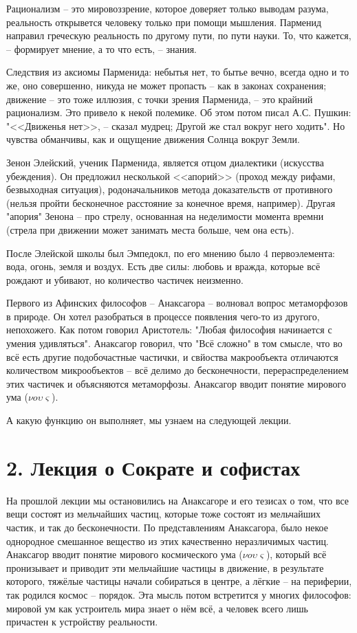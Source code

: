 \documentclass[a4paper, 12pt]{book} %
\begin{document}
Рационализм -- это мировоззрение, которое доверяет только выводам разума, реальность открывется человеку только при помощи мышления. Парменид направил греческую реальность по другому пути, по пути науки. То, что кажется, -- формирует мнение, а то что есть, -- знания.

Следствия из аксиомы Парменида: небытья нет, то бытье вечно, всегда одно и то же, оно совершенно, никуда не может пропасть -- как в законах сохранения; движение -- это тоже иллюзия, с точки зрения Парменида, -- это крайний рационализм. Это привело к некой полемике. Об этом потом писал А.С. Пушкин: "<<Движенья нет>>, -- сказал мудрец; Другой же стал вокруг него ходить". Но чувства обманчивы, как и ощущение движения Солнца вокруг Земли.

Зенон Элейский, ученик Парменида, является отцом диалектики (искусства убеждения). Он предложил несколькой <<апорий>> (проход между рифами, безвыходная ситуация), родоначальников метода доказательств от противного (нельзя пройти бесконечное расстояние за конечное время, например). Другая "апория" Зенона -- про стрелу, основанная на неделимости момента времни (стрела при движении может занимать места больше, чем она есть).

После Элейской школы был Эмпедокл, по его мнению было 4 первоэлемента: вода, огонь, земля и воздух. Есть две силы: любовь и вражда, которые всё рождают и убивают, но количество частичек неизменно.

Первого из Афинских философов -- Анаксагора -- волновал вопрос метаморфозов в природе. Он хотел разобраться в процессе появления чего-то из другого, непохожего. Как потом говорил Аристотель: "Любая философия начинается с умения удивляться". Анаксагор говорил, что "Всё сложно" в том смысле, что во всё есть другие подобочастные частички, и свйоства макрообъекта отличаются количеством микрообъектов -- всё делимо до бесконечности, перераспределением этих частичек и объясняются метаморфозы. Анаксагор вводит понятие мирового ума ($\nu o \upsilon \varsigma $).

 А какую функцию он выполняет, мы узнаем на следующей лекции.

\newpage

\section*{2. Лекция о Сократе и софистах}

На прошлой лекции мы остановились на Анаксагоре и его тезисах о том, что все вещи состоят из мельчайших частиц, которые тоже состоят из мельчайших частик, и так до бесконечности. По представлениям Анаксагора, было некое однородное смешанное вещество из этих качественно неразличимых частиц. Анаксагор вводит понятие мирового космического ума ($\nu o \upsilon \varsigma $), который всё пронизывает и приводит эти мельчайшие частицы в движение, в результате которого, тяжёлые частицы начали собираться в центре, а лёгкие  -- на периферии, так родился космос -- порядок. Эта мысль потом встретится у многих философов: мировой ум как устроитель мира знает о нём всё, а человек всего лишь причастен к устройству реальности.
\end{document}
